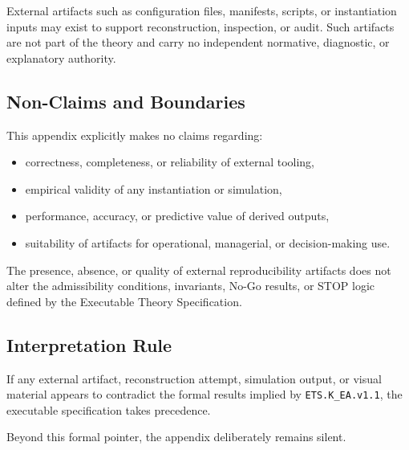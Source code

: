 External artifacts such as configuration files, manifests, scripts, or
instantiation inputs may exist to support reconstruction, inspection,
or audit.
Such artifacts are not part of the theory and carry no independent
normative, diagnostic, or explanatory authority.

\subsection*{Non-Claims and Boundaries}

This appendix explicitly makes no claims regarding:
\begin{itemize}
  \item correctness, completeness, or reliability of external tooling,
  \item empirical validity of any instantiation or simulation,
  \item performance, accuracy, or predictive value of derived outputs,
  \item suitability of artifacts for operational, managerial, or
        decision-making use.
\end{itemize}

The presence, absence, or quality of external reproducibility artifacts
does not alter the admissibility conditions, invariants, No-Go results,
or STOP logic defined by the Executable Theory Specification.

\subsection*{Interpretation Rule}

If any external artifact, reconstruction attempt, simulation output, or
visual material appears to contradict the formal results implied by
\texttt{ETS.K\_EA.v1.1}, the executable specification takes precedence.

Beyond this formal pointer, the appendix deliberately remains silent.

